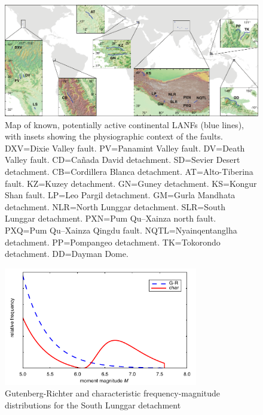 \documentclass[draft,grl]{AGUTeX}
\begin{document}
\begin{figure}
\noindent\includegraphics[width=40pc]{./figures/active_lanfs_map_insets.pdf}
\caption{Map of known, potentially active continental LANFs (blue lines), with
insets showing the physiographic context of the faults.  DXV=Dixie Valley
fault.  PV=Panamint Valley fault.  DV=Death Valley fault.  CD=Ca\~nada David
detachment.  SD=Sevier Desert detachment.  CB=Cordillera Blanca detachment.  
AT=Alto-Tiberina fault.  KZ=Kuzey detachment.  GN=Guney detachment.  
KS=Kongur Shan fault.  LP=Leo Pargil detachment.  GM=Gurla Mandhata 
detachment. NLR=North Lunggar detachment.  SLR=South Lunggar detachment.  
PXN=Pum Qu--Xainza north fault.  PXQ=Pum Qu--Xainza Qingdu fault. 
NQTL=Nyainqentanglha detachment.  PP=Pompangeo detachment.  
TK=Tokorondo detachment.  DD=Dayman Dome.}
\label{fig:lanf_map}
\end{figure}


\begin{figure}[b]
\noindent\includegraphics[width=20pc]{./figures/F-Ms.pdf}
\caption{Gutenberg-Richter and characteristic frequency-magnitude 
 		 distributions for the South Lunggar detachment}
\label{fig:fms}
\end{figure}
\end{document}
